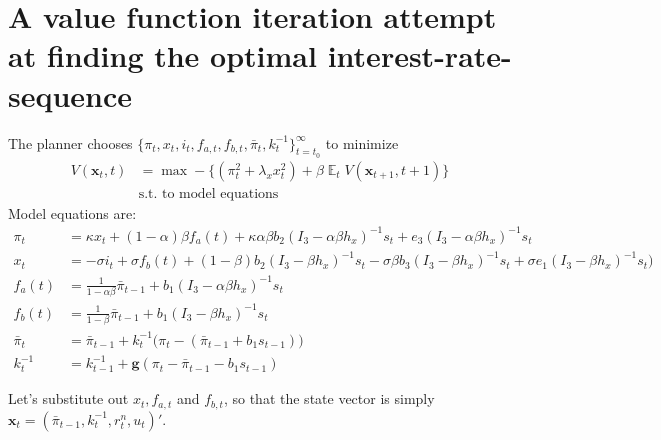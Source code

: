 \documentclass[11pt]{article}
\renewcommand{\[}{\begin{equation}}
\renewcommand{\]}{\end{equation}}
\DeclareMathOperator{\E}{\mathbb{E}}
\begin{document}
\section{A value function iteration attempt at finding the optimal interest-rate-sequence}
The planner chooses $\{\pi_t, x_t, i_t, f_{a,t},  f_{b,t}, \bar{\pi}_t, k_t^{-1}\}_{t=t_0}^{\infty}$ to minimize
\begin{align}
V(\mathbf{x}_t,t)& = \max -\bigg\{ (\pi_t^2 + \lambda_x x_t^2) + \beta \E_t V(\mathbf{x}_{t+1},t+1) \bigg\} \\
& \text{s.t. to model equations}
\end{align}
Model equations are:
 \begin{align}
 \pi_t & = \kappa x_t +(1-\alpha)\beta f_a(t) +\kappa\alpha\beta b_2 (I_3 - \alpha\beta h_x)^{-1}s_t +e_3(I_3 - \alpha\beta h_x)^{-1}s_t  \label{midsimple_first}\\
 x_t & = -\sigma i_t +\sigma f_b(t)  +  (1-\beta)b_2 (I_3 - \beta h_x)^{-1}s_t - \sigma\beta b_3 (I_3 - \beta h_x)^{-1}s_t +\sigma e_1(I_3 - \beta h_x)^{-1}s_t  \big) \\
 f_a(t) &= \frac{1}{1-\alpha\beta}\bar{\pi}_{t-1}  + b_1(I_3 - \alpha\beta h_x)^{-1}s_t  \\
 f_b(t) & = \frac{1}{1-\beta}\bar{\pi}_{t-1}  + b_1(I_3 - \beta h_x)^{-1}s_t  \\
 \bar{\pi}_{t} & = \bar{\pi}_{t-1} + k_t^{-1}\big(\pi_{t} -(\bar{\pi}_{t-1}+b_1 s_{t-1}) \big)     \\
 k_t^{-1} & = k_{t-1}^{-1}+ \mathbf{g}(\pi_t - \bar{\pi}_{t-1}-b_1 s_{t-1})  
 \label{midsimple_last}
\end{align}

\newpage
Let's substitute out $x_t, f_{a,t}$ and $f_{b,t}$, so that the state vector is simply $\mathbf{x}_t = (\bar{\pi}_{t-1}, k_t^{-1},r_t^n,u_t)'$.
\end{document}

